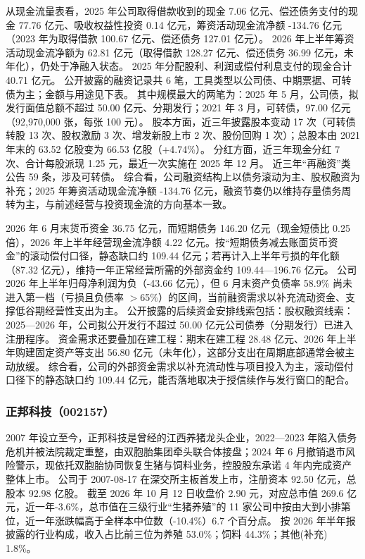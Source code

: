  从现金流量表看，2025 年公司取得借款收到的现金 7.06 亿元、偿还债务支付的现金 77.76 亿元、吸收权益性投资 0.14 亿元，筹资活动现金流净额 -134.76 亿元（2023 年为取得借款 100.67 亿元、偿还债务 127.01 亿元）。 2026 年上半年筹资活动现金流净额为 62.81 亿元（取得借款 128.27 亿元、偿还债务 36.99 亿元，未年化），仍处于净融入状态。 2025 年分配股利、利润或偿付利息支付的现金合计 40.71 亿元。 公开披露的融资记录共 6 笔，工具类型以公司债、中期票据、可转债为主；金额与用途见下表。 其中规模最大的两笔为：2025 年 5 月，公司债，拟发行面值总额不超过 50.00 亿元、分期发行；2021 年 3 月，可转债，97.00 亿元（92,970,000 张，每张 100 元）。 股本方面，近三年披露股本变动 17 次（可转债转股 13 次、股权激励 3 次、增发新股上市 2 次、股份回购 1 次）；总股本由 2021 年末的 63.52 亿股变为 66.53 亿股（+4.74\%）。 分红方面，近三年现金分红 7 次、合计每股派现 1.25 元，最近一次实施在 2025 年 12 月。 近三年“再融资”类公告 59 条，涉及可转债。 综合看，公司融资结构上以债务滚动为主、股权融资为补充；2025 年筹资活动现金流净额 -134.76 亿元，融资节奏仍以维持存量债务周转为主，与前述经营与投资现金流的方向基本一致。

 2026 年 6 月末货币资金 36.75 亿元，而短期债务 146.20 亿元（现金短债比 0.25 倍），2026 年上半年经营现金流净额 4.22 亿元。按“短期债务减去账面货币资金”的滚动偿付口径，静态缺口约 109.44 亿元；若再计入上半年亏损的年化额（87.32 亿元），维持一年正常经营所需的外部资金约 109.44---196.76 亿元。 公司 2026 年上半年归母净利润为负（-43.66 亿元），但 6 月末资产负债率 58.9\% 尚未进入第一档（亏损且负债率 $>$65\%）的区间，当前融资需求以补充流动资金、支撑低谷期经营性支出为主。 公开披露的后续资金安排线索包括：股权融资线索：2025---2026 年，公司拟公开发行不超过 50.00 亿元公司债券（分期发行）已进入注册程序。 资金需求还要叠加在建工程：期末在建工程 28.48 亿元、2026 年上半年购建固定资产等支出 56.80 亿元（未年化），这部分支出在周期底部通常会被主动放缓。 综合看，公司的外部资金需求以补充流动性与项目投入为主，滚动偿付口径下的静态缺口约 109.44 亿元，能否落地取决于授信续作与发行窗口的配合。




\subsubsection{正邦科技（002157）}
\label{co:002157}

 2007 年设立至今，正邦科技是曾经的江西养猪龙头企业，2022—2023 年陷入债务危机并被法院裁定重整，由双胞胎集团牵头联合体接盘；2024 年 6 月撤销退市风险警示，现依托双胞胎协同恢复生猪与饲料业务，控股股东承诺 4 年内完成资产整体上市。 公司于 2007-08-17 在深交所主板首发上市，注册资本 92.50 亿元，总股本 92.98 亿股。 截至 2026 年 10 月 12 日收盘价 2.90 元，对应总市值 269.6 亿元，近一年-3.6\%，总市值在三级行业“生猪养殖”的 11 家公司中按由大到小排第位，近一年涨跌幅高于全样本中位数（-10.4\%）6.7 个百分点。 按 2026 年半年报披露的行业构成，收入占比前三位为养殖 53.0\%；饲料 44.3\%；其他(补充) 1.8\%。

